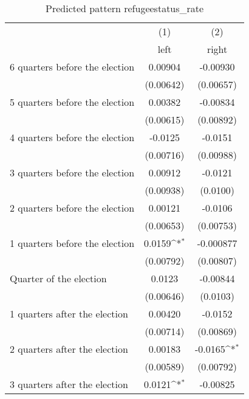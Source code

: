 \begin{table}[htbp]\centering
\def\sym#1{\ifmmode^{#1}\else\(^{#1}\)\fi}
\caption{Predicted pattern refugeestatus\_rate}
\begin{tabular}{l*{2}{c}}
\hline\hline
                    &\multicolumn{1}{c}{(1)}&\multicolumn{1}{c}{(2)}\\
                    &\multicolumn{1}{c}{left}&\multicolumn{1}{c}{right}\\
\hline
 6 quarters before the election&     0.00904         &    -0.00930         \\
                    &   (0.00642)         &   (0.00657)         \\
[1em]
 5 quarters before the election&     0.00382         &    -0.00834         \\
                    &   (0.00615)         &   (0.00892)         \\
[1em]
 4 quarters before the election&     -0.0125         &     -0.0151         \\
                    &   (0.00716)         &   (0.00988)         \\
[1em]
 3 quarters before the election&     0.00912         &     -0.0121         \\
                    &   (0.00938)         &    (0.0100)         \\
[1em]
 2 quarters before the election&     0.00121         &     -0.0106         \\
                    &   (0.00653)         &   (0.00753)         \\
[1em]
 1 quarters before the election&      0.0159\sym{*}  &   -0.000877         \\
                    &   (0.00792)         &   (0.00807)         \\
[1em]
Quarter of the election&      0.0123         &    -0.00844         \\
                    &   (0.00646)         &    (0.0103)         \\
[1em]
 1 quarters after the election&     0.00420         &     -0.0152         \\
                    &   (0.00714)         &   (0.00869)         \\
[1em]
 2 quarters after the election&     0.00183         &     -0.0165\sym{*}  \\
                    &   (0.00589)         &   (0.00792)         \\
[1em]
 3 quarters after the election&      0.0121\sym{*}  &    -0.00825         \\

\end{tabular}
\end{table}
